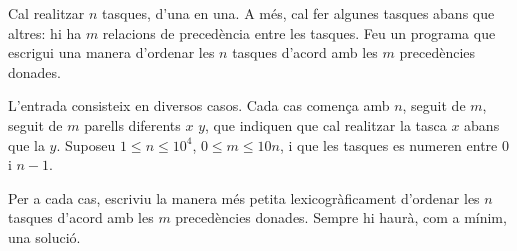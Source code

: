 

\Statement

Cal realitzar $n$ tasques, d'una en una.
A més, cal fer algunes tasques abans que altres:
hi ha $m$ relacions de precedència entre les tasques.
Feu un programa que escrigui una manera
d'ordenar les $n$ tasques d'acord amb les $m$ precedències donades.


\Input

L'entrada consisteix en diversos casos.
Cada cas comença amb $n$,
seguit de $m$,
seguit de $m$ parells diferents $x$ $y$,
que indiquen que cal realitzar la tasca $x$ abans que la $y$.
Suposeu $1 \le n \le 10^4$,
$0 \le m \le 10n$,
i que les tasques es numeren entre 0 i $n - 1$.


\Output

Per a cada cas, escriviu la manera més petita lexicogràficament
d'ordenar les $n$ tasques d'acord amb les $m$ precedències donades.
Sempre hi haurà, com a mínim, una solució.


\Sample

